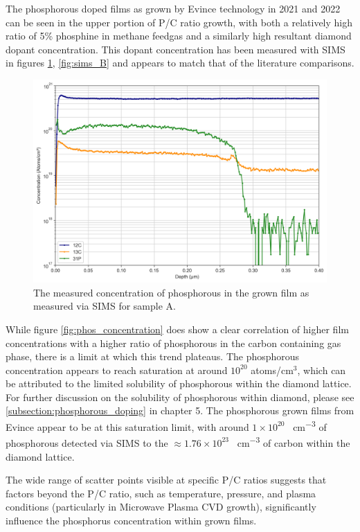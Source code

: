 The phosphorous doped films as grown by Evince technology in 2021 and 2022 can be seen in the upper portion of P/C ratio growth, with both a relatively high ratio of 5\% phosphine in methane feedgas and a similarly high resultant diamond dopant concentration. This dopant concentration has been measured with SIMS in figures \ref{fig:sims_A}, \ref{fig:sims_B} and appears to match that of the literature comparisons.

\begin{figure}[h]
\centering
\includegraphics[width=\textwidth]{SIMS Depth Profile 49A.png}
\caption{The measured concentration of phosphorous in the grown film as measured via SIMS for sample A.}
\label{fig:sims_A}
\end{figure}

While figure \ref{fig:phos_concentration} does show a clear correlation of higher film concentrations with a higher ratio of phosphorous in the carbon containing gas phase, there is a limit at which this trend plateaus. The phosphorous concentration appears to reach saturation at around $10^{20}$ atoms/cm$^{3}$, which can be attributed to the limited solubility of phosphorous within the diamond lattice. For further discussion on the solubility of phosphorous within diamond, please see \ref{subsection:phosphorous_doping} in chapter 5. The phosphorous grown films from Evince appear to be at this saturation limit, with around $1\times10^{20}$ \si{\atoms\per\centi\metre\cubed} of phosphorous detected via SIMS to the $\approx1.76\times10^{23}$ \si{\atoms\per\centi\metre\cubed} of carbon within the diamond lattice.

The wide range of scatter points visible at specific P/C ratios suggests that factors beyond the P/C ratio, such as temperature, pressure, and plasma conditions (particularly in Microwave Plasma CVD growth), significantly influence the phosphorus concentration within grown films.

